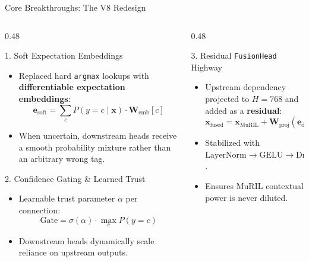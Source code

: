 \documentclass[aspectratio=169, 10pt]{beamer}
\begin{document}
\begin{frame}{Core Breakthroughs: The V8 Redesign}
  \begin{columns}[T]
    \begin{column}{0.48\textwidth}
      \begin{block}{1. Soft Expectation Embeddings}
        \begin{itemize}
          \item Replaced hard \texttt{argmax} lookups with \textbf{differentiable expectation embeddings}:
          \[
            \mathbf{e}_{\text{soft}} = \sum_{c} P(y=c \mid \mathbf{x}) \cdot \mathbf{W}_{\text{emb}}[c]
          \]
          \item When uncertain, downstream heads receive a smooth probability mixture rather than an arbitrary wrong tag.
        \end{itemize}
      \end{block}

      \begin{block}{2. Confidence Gating \& Learned Trust}
        \begin{itemize}
          \item Learnable trust parameter $\alpha$ per connection:
          \[
            \text{Gate} = \sigma(\alpha) \cdot \max_c P(y=c)
          \]
          \item Downstream heads dynamically scale reliance on upstream outputs.
        \end{itemize}
      \end{block}
    \end{column}

    \begin{column}{0.48\textwidth}
      \begin{block}{3. Residual \texttt{FusionHead} Highway}
        \begin{itemize}
          \item Upstream dependency projected to $H=768$ and added as a \textbf{residual}:
          \[
            \mathbf{x}_{\text{fused}} = \mathbf{x}_{\text{MuRIL}} + \mathbf{W}_{\text{proj}}(\mathbf{e}_{\text{dep}})
          \]
          \item Stabilized with $\text{LayerNorm} \rightarrow \text{GELU} \rightarrow \text{Dropout}$.
          \item Ensures MuRIL contextual power is never diluted.
        \end{itemize}
      \end{block}


\end{column}
\end{columns}
\end{frame}
\end{document}
